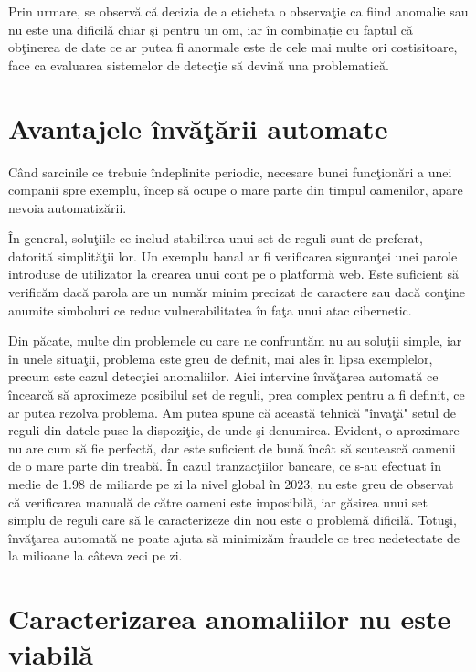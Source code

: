 Prin urmare, se observă că decizia de a eticheta o observaţie ca fiind anomalie 
sau nu este una dificilă chiar şi pentru un om, iar în combinație cu faptul 
că obţinerea de date ce ar putea fi anormale este de cele mai multe ori costisitoare,
face ca evaluarea sistemelor de detecţie să devină una problematică.


\section{Avantajele învăţării automate}

Când sarcinile ce trebuie îndeplinite periodic, necesare bunei funcţionări a unei 
companii spre exemplu, încep să ocupe o mare parte din timpul oamenilor, apare 
nevoia automatizării. 

În general, soluţiile ce includ stabilirea unui set de reguli
sunt de preferat, datorită simplităţii lor. Un exemplu banal ar fi verificarea 
siguranţei unei parole introduse de utilizator la crearea unui cont pe o platformă
web. Este suficient să verificăm dacă parola are un număr minim precizat de caractere 
sau dacă conţine anumite simboluri ce reduc vulnerabilitatea în faţa unui atac cibernetic.

Din păcate, multe din problemele cu care ne confruntăm nu au soluţii simple, 
iar 
în unele situaţii, problema este greu de definit, mai ales în lipsa exemplelor, precum 
este cazul detecţiei anomaliilor.
Aici intervine învăţarea automată ce încearcă să aproximeze posibilul set de reguli, 
prea complex pentru a fi definit, ce ar putea rezolva problema. Am putea spune că 
această tehnică "învaţă" setul de reguli 
din datele puse la dispoziţie, de unde şi denumirea. Evident, o aproximare 
nu are cum să fie perfectă, dar este suficient de bună încât să scutească oamenii de 
o mare parte din treabă. În cazul tranzacţiilor bancare, 
ce s-au efectuat în medie 
de 1.98 de miliarde pe zi la nivel global în 2023\cite{transactions-per-day}, 
nu este greu de observat că verificarea manuală
de către oameni este imposibilă, iar găsirea unui set simplu de reguli care să 
le caracterizeze din nou este o problemă dificilă. Totuşi, învăţarea automată 
ne poate ajuta să minimizăm fraudele ce trec nedetectate de la milioane la câteva zeci
pe zi.

\section{Caracterizarea anomaliilor nu este viabilă}

